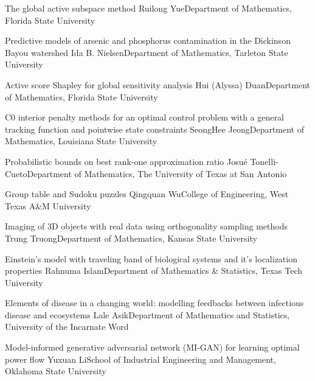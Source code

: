 \begin{posters}


\label{poster}
\item\poster %
{The global active subspace method}
{Ruilong Yue}{Department of Mathematics, Florida State University}

\item\poster %
{Predictive models of arsenic and phosphorus contamination in the Dickinson Bayou watershed}
{Ida B. Nielsen}{Department of Mathematics, Tarleton State University}

\item\poster %
{Active score Shapley for global sensitivity analysis}
{Hui (Alyssa) Duan}{Department of Mathematics, Florida State University}

\item\poster %
{C0 interior penalty methods for an optimal control problem with a general tracking function and pointwise state constraints}
{SeongHee Jeong}{Department of Mathematics, Louisiana State University}

\item\poster %
{Probabilistic bounds on best rank-one approximation ratio}
{Josu\'e Tonelli-Cueto}{Department of Mathematics, The University of Texas at San Antonio}

\item\poster %
{Group table and Sudoku puzzles}
{Qingquan Wu}{College of Engineering, West Texas A\&M University}

\item\poster %
{Imaging of 3D objects with real data using orthogonality sampling methods}
{Trung Truong}{Department of Mathematics, Kansas State University}

\item\poster %
{Einstein’s model with traveling band of biological systems and it’s localization properties}
{Rahnuma Islam}{Department of Mathematics \& Statistics, Texas Tech University}

\item\poster %
{Elements of disease in a changing world: modelling feedbacks between infectious disease and ecosystems}
{Lale Asik}{Department of Mathematics and Statistics, University of the Incarnate Word}

\item\poster %
{Model-informed generative adversarial network (MI-GAN) for learning optimal power flow}
{Yuxuan Li}{School of Industrial Engineering and Management, Oklahoma State University}


\end{posters}
